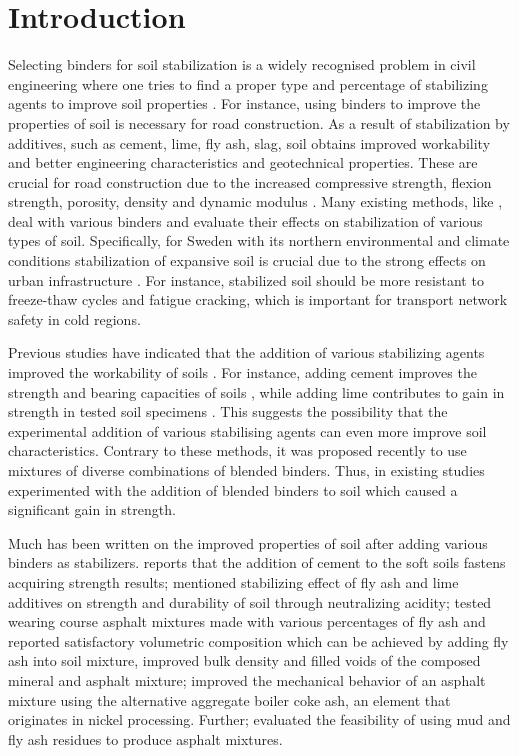\documentclass[constrmater,article,submit,pdftex,moreauthors]{Definitions/mdpi}
\begin{document}
\section{Introduction}

Selecting binders for soil stabilization is a widely recognised problem in civil engineering where one tries to find a proper type and percentage of stabilizing agents to improve soil properties \cite{Consoli2019,daRocha,Freitag}. For instance, using binders to improve the properties of soil is necessary for road construction. As a result of stabilization by additives, such as cement, lime, fly ash, slag, soil obtains improved workability and better engineering characteristics and geotechnical properties. These are crucial for road construction due to the increased compressive strength, flexion strength, porosity, density and dynamic modulus \cite{Carasca}. Many existing methods, like \cite{Mypati,Sargent}, deal with various binders and evaluate their effects on stabilization of various types of soil. Specifically, for Sweden with its northern environmental and climate conditions stabilization of expansive soil is crucial due to the strong effects on urban infrastructure \citep{Amorim,Gustavsson}. For instance, stabilized soil should be more resistant to freeze-thaw cycles and fatigue cracking, which is important for transport network safety in cold regions. 

Previous studies have indicated that the addition of various stabilizing agents improved the workability of soils \citep{Etim,Fasihnikoutalab,Kogbara,Lindh2022b,Mavroulidou}. For instance, adding cement improves the strength and bearing capacities of soils \cite{Ekpo}, while adding lime contributes to gain in strength in tested soil specimens \cite{Frempong}. This suggests the possibility that the experimental addition of various stabilising agents can even more improve soil characteristics. Contrary to these methods, it was proposed recently to use mixtures of diverse combinations of blended binders. Thus, in existing studies \citep{Abbey,AlHdabi,ma15217798,Jafer,Lietal2021,Wangetal2015} experimented with the addition of blended binders to soil which caused a significant gain in strength.

Much has been written on the improved properties of soil after adding various binders as stabilizers. \cite{Consoli} reports that the addition of cement to the soft soils fastens acquiring strength results; \cite{MESKINI2021129161} mentioned stabilizing effect of fly ash and lime additives on strength and durability of soil through neutralizing acidity; \cite{Mirkovic} tested wearing course asphalt mixtures made with various percentages of fly ash and reported satisfactory volumetric composition which can be achieved by adding fly ash into soil mixture, improved bulk density and filled voids of the composed mineral and asphalt mixture; \cite{app12189134} improved the mechanical behavior of an asphalt mixture using the alternative aggregate boiler coke ash, an element that originates in nickel processing. Further; \cite{Lima} evaluated the feasibility of using mud and fly ash residues to produce asphalt mixtures. 
\end{document}
